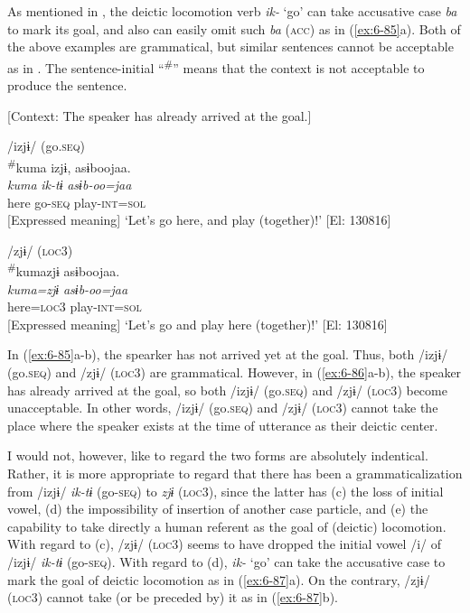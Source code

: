 As mentioned in , the deictic locomotion verb \textit{ik-} ‘go’ can take accusative case \textit{ba} to mark its goal, and also can easily omit such \textit{ba} (\textsc{acc}) as in (\ref{ex:6-85}a). Both of the above examples are grammatical, but similar sentences cannot be acceptable as in . The sentence-initial “\textsuperscript{\#}” means that the context is not acceptable to produce the sentence.

\ea\label{ex:6-86}
  [Context: The speaker has already arrived at the goal.]

 \ea /izjɨ/ (go.\textsc{seq})\\
{\TM}
\glll  \textsuperscript{\#}kuma  izjɨ,  asɨboojaa.\\
\textit{kuma}  \textit{ik-tɨ}  \textit{asɨb-oo=jaa}\\
here  go-\textsc{seq}  play-\textsc{int}=\textsc{sol}\\
{}[Expressed meaning] ‘Let’s go here, and play (together)!’ [El: 130816]

\ex /zjɨ/ (\textsc{loc3})\\
{\TM}
\glll  \textsuperscript{\#}kumazjɨ  asɨboojaa.\\
\textit{kuma=zjɨ}  \textit{asɨb-oo=jaa}\\
here=\textsc{loc3}  play-\textsc{int}=\textsc{sol}\\
{}    [Expressed meaning] ‘Let’s go and play here (together)!’ [El: 130816]
\z
\z

In (\ref{ex:6-85}a-b), the spearker has not arrived yet at the goal. Thus, both /izjɨ/ (go.\textsc{seq}) and /zjɨ/ (\textsc{loc3}) are grammatical. However, in (\ref{ex:6-86}a-b), the speaker has already arrived at the goal, so both /izjɨ/ (go.\textsc{seq}) and /zjɨ/ (\textsc{loc3}) become unacceptable. In other words, /izjɨ/ (go.\textsc{seq}) and /zjɨ/ (\textsc{loc3}) cannot take the place where the speaker exists at the time of utterance as their deictic center.

  I would not, however, like to regard the two forms are absolutely indentical. Rather, it is more appropriate to regard that there has been a grammaticalization from /izjɨ/ \textit{ik-tɨ} (go-\textsc{seq}) to \textit{zjɨ} (\textsc{loc3}), since the latter has (c) the loss of initial vowel, (d) the impossibility of insertion of another case particle, and (e) the capability to take directly a human referent as the goal of (deictic) locomotion. With regard to (c), /zjɨ/ (\textsc{loc3}) seems to have dropped the initial vowel /i/ of /izjɨ/ \textit{ik-tɨ} (go-\textsc{seq}). With regard to (d), \textit{ik-} ‘go’ can take the accusative case to mark the goal of deictic locomotion as in (\ref{ex:6-87}a). On the contrary, /zjɨ/ (\textsc{loc3}) cannot take (or be preceded by) it as in (\ref{ex:6-87}b).

